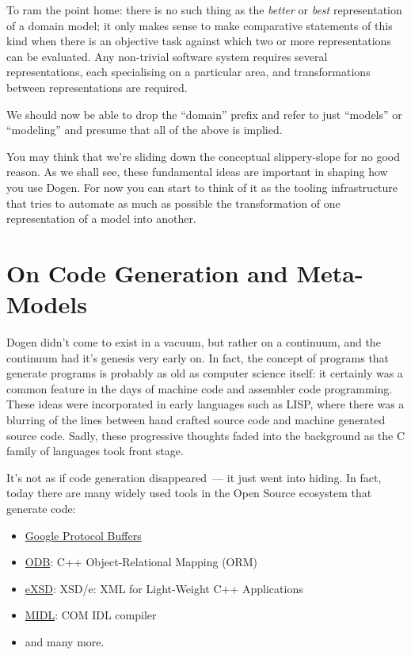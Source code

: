 \documentclass{book}
\begin{document}
To ram the point home: there is no such thing as the \emph{better} or
\emph{best} representation of a domain model; it only makes sense to
make comparative statements of this kind when there is an objective
task against which two or more representations can be evaluated. Any
non-trivial software system requires several representations, each
specialising on a particular area, and transformations between
representations are required.

We should now be able to drop the ``domain'' prefix and refer to just
``models'' or ``modeling'' and presume that all of the above is implied.

You may think that we're sliding down the conceptual slippery-slope
for no good reason. As we shall see, these fundamental ideas are
important in shaping how you use Dogen. For now you can start to think
of it as the tooling infrastructure that tries to automate as much as
possible the transformation of one representation of a model into
another.

\section{On Code Generation and Meta-Models}

Dogen didn't come to exist in a vacuum, but rather on a continuum, and
the continuum had it's genesis very early on. In fact, the concept of
programs that generate programs is probably as old as computer science
itself: it certainly was a common feature in the days of machine code
and assembler code programming. These ideas were incorporated in early
languages such as LISP, where there was a blurring of the lines
between hand crafted source code and machine generated source
code. Sadly, these progressive thoughts faded into the background as
the C family of languages took front stage.

It's not as if code generation disappeared~--- it just went into
hiding. In fact, today there are many widely used tools in the Open
Source ecosystem that generate code:

\begin{itemize}
\item \href{https://developers.google.com/protocol-buffers/}{Google Protocol Buffers}
\item \href{http://www.codesynthesis.com/products/odb/}{ODB}: C++ Object-Relational Mapping (ORM)
\item \href{http://www.codesynthesis.com/products/xsde/}{eXSD}: XSD/e: XML for Light-Weight C++ Applications
\item \href{http://msdn.microsoft.com/en-us/library/windows/desktop/aa367300(v\%3Dvs.85).aspx}{MIDL}: COM IDL compiler
\item and many more.
\end{itemize}
\end{document}
